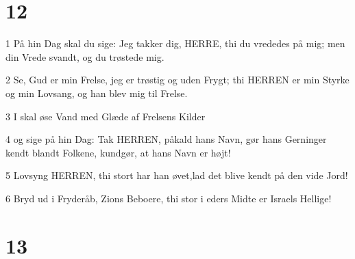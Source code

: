 \chapter{12}

\par 1 På hin Dag skal du sige: Jeg takker dig, HERRE, thi du vrededes på mig; men din Vrede svandt, og du trøstede mig.
\par 2 Se, Gud er min Frelse, jeg er trøstig og uden Frygt; thi HERREN er min Styrke og min Lovsang, og han blev mig til Frelse.
\par 3 I skal øse Vand med Glæde af Frelsens Kilder
\par 4 og sige på hin Dag: Tak HERREN, påkald hans Navn, gør hans Gerninger kendt blandt Folkene, kundgør, at hans Navn er højt!
\par 5 Lovsyng HERREN, thi stort har han øvet,lad det blive kendt på den vide Jord!
\par 6 Bryd ud i Fryderåb, Zions Beboere, thi stor i eders Midte er Israels Hellige!

\chapter{13}

